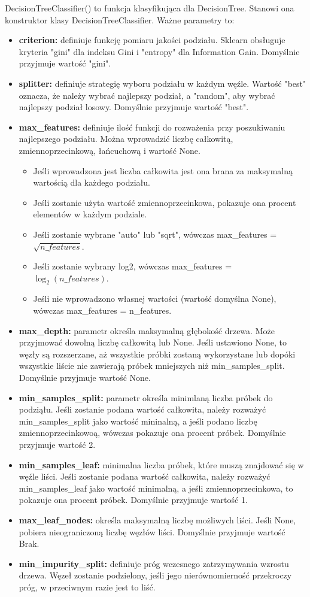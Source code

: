 \documentclass[10pt,a4paper]{article}
\begin{document}
DecisionTreeClassifier() to funkcja klasyfikująca dla DecisionTree. Stanowi ona konstruktor klasy DecisionTreeClassifier. Ważne parametry to:
\begin{itemize}
	\item \textbf{criterion:} definiuje funkcję pomiaru jakości podziału. Sklearn obsługuje kryteria "gini" dla indeksu Gini i "entropy" dla Information Gain. Domyślnie przyjmuje wartość "gini".
	\item \textbf{splitter:} definiuje strategię wyboru podziału w każdym węźle. Wartość "best" oznacza, że należy wybrać najlepszy podział, a "random", aby wybrać najlepszy podział losowy. Domyślnie przyjmuje wartość "best".
	\item \textbf{max\_features:} definiuje ilość funkcji do rozważenia przy poszukiwaniu najlepszego podziału. Można wprowadzić liczbę całkowitą, zmiennoprzecinkową, łańcuchową i wartość None.
	\begin{itemize}
		\item Jeśli wprowadzona jest liczba całkowita jest ona brana za maksymalną wartością dla każdego podziału.
		\item Jeśli zostanie użyta wartość zmiennoprzecinkowa, pokazuje ona procent elementów w każdym podziale.
		\item Jeśli zostanie wybrane "auto" lub "sqrt", wówczas max\_features = $\sqrt{n\_features}$.
		\item Jeśli zostanie wybrany log2, wówczas max\_features = $\log_2{(n\_features)}$.
		\item Jeśli nie wprowadzono własnej wartości (wartość domyślna None), wówczas max\_features = n\_features.
	\end{itemize}

	\item \textbf{max\_depth:} parametr określa maksymalną głębokość drzewa. Może przyjmować dowolną liczbę całkowitą lub None. Jeśli ustawiono None, to węzły są rozszerzane, aż wszystkie próbki zostaną wykorzystane lub dopóki wszystkie liście nie zawierają próbek mniejszych niż min\_samples\_split. Domyślnie przyjmuje wartość None.
	\item \textbf{min\_samples\_split:} parametr określa minimlaną liczba próbek do podziąłu. Jeśli zostanie podana wartość całkowita, należy rozważyć min\_samples\_split jako wartość mininalną, a jeśli podano liczbę zmiennoprzecinkowoą, wówczas pokazuje ona procent próbek. Domyślnie przyjmuje wartość 2.
	\item \textbf{min\_samples\_leaf:} minimalna liczba próbek, które muszą znajdować się w węźle liści. Jeśli zostanie podana wartość całkowita, należy rozważyć min\_samples\_leaf jako wartość minimalną, a jeśli zmiennoprzecinkowa, to pokazuje ona procent próbek. Domyślnie przyjmuje wartość 1.
	\item \textbf{max\_leaf\_nodes:} określa maksymalną liczbę możliwych liści. Jeśli None, pobiera nieograniczoną liczbę węzłów liści. Domyślnie przyjmuje wartość Brak.
	\item \textbf{min\_impurity\_split:} definiuje próg wczesnego zatrzymywania wzrostu drzewa. Węzeł zostanie podzielony, jeśli jego nierównomierność przekroczy próg, w przeciwnym razie jest to liść.
\end{itemize}
\vskip 0.2in
\end{document}
